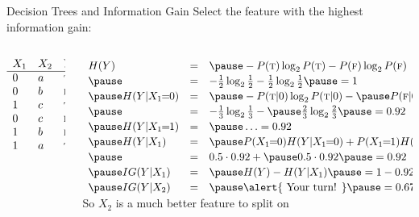 \documentclass[14pt]{beamer}
\begin{document}
\begin{frame}{Decision Trees and Information Gain}
Select the feature with the highest information gain:\\
\medskip
\begin{columns}[T]
\begin{column}{0.14\textwidth}
\setlength{\arraycolsep}{0.1em}
\small
$
\begin{array}{ l l l }
X_1 & X_2 & Y \\
\hline
0   & a   & \textsc{t} \\
0   & b   & \textsc{f} \\
1   & c   & \textsc{t} \\
0   & c   & \textsc{f} \\
1   & b   & \textsc{f} \\
1   & a   & \textsc{t} \\
\end{array}
$
\end{column}
\pause
\begin{column}{0.83\textwidth}
\setlength{\arraycolsep}{0.1em}
\small
$
\extrarowheight=2pt
\begin{array}{ l l l l }
H(Y)
& = & \pause -P(\textsc{t})\log_2 P(\textsc{t}) - P(\textsc{f})\log_2 P(\textsc{f}) \\
\pause
& = & -\frac{1}{2}\log_2 \frac{1}{2} - \frac{1}{2}\log_2 \frac{1}{2} \pause = 1 \\
\pause
H(Y|X_1\!\!=\!\!0)
& = & \pause -P(\textsc{t}|0)\log_2 P(\textsc{t}|0) - \pause P(\textsc{f}|0)\log_2 P(\textsc{f}|0) \\
\pause
& = & - \frac{1}{3}\log_2 \frac{1}{3} - \pause \frac{2}{3}\log_2 \frac{2}{3} \pause = 0.92\\
\pause         
H(Y|X_1\!\!=\!\!1)
& = & \pause \ldots = 0.92\\
\pause         
H(Y|X_1)
& = & \pause P(X_1\!\!=\!\!0) H(Y|X_1\!\!=\!\!0) + P(X_1\!\!=\!\!1) H(Y|X_1\!\!=\!\!1) \\
\pause         
& = & 0.5 \cdot 0.92 + \pause 0.5 \cdot 0.92 \pause = 0.92 \\
\pause
IG(Y|X_1)
& = & \pause H(Y) - H(Y|X_1) \pause = 1 - 0.92 \pause = 0.08 \\
\pause         
IG(Y|X_2)
& = & \pause \mbox{\alert{ Your turn! }} \pause = 0.67 \\
\end{array}
$ \\
\medskip
\pause
So $X_2$ is a much better feature to split on
\end{column}
\end{columns}
\end{frame}
\end{document}
